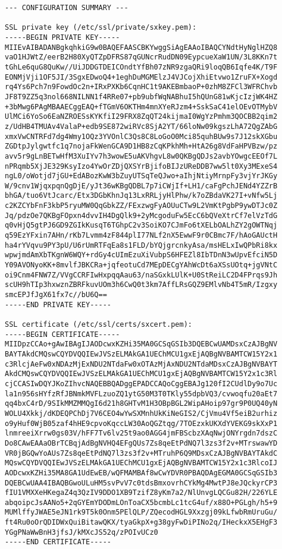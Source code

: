 \begin{lstlisting}
--- CONFIGURATION SUMMARY ---

SSL private key (/etc/ssl/private/sxkey.pem):
-----BEGIN PRIVATE KEY-----
MIIEvAIBADANBgkqhkiG9w0BAQEFAASCBKYwggSiAgEAAoIBAQCYNdtHyNglHZQ8
vaO1HJWtZ/eerB2H80XyQTZpDFRS87qGUNcrRudDN09EypcueXaW1UN/3L8KKn7t
tGhLe6quG8QuKw//UiJDDGTDEICOndtYfBh07zNR9zgaQRi9loqQB6Iqfe4K/T9F
EONMjVji1OF5JI/3SgxEDwoQ4+1eghDuMGMElzJ4VJCojXhiEtvwo1ZruFX+Xogd
rq4Ys6Pch7n9FowdOc2n+IRxPXKb6CqnHC1t9AKEBmbaoP+0zhM8ZFCl3WFRChvb
JF8T9ZZ5q3nol668NILNN1f4RRe07+pb9ubfWqNABhuI5hQUnG81wKjcIzjWK4HZ
+3bMwg6PAgMBAAECggEAQ+fTGmV6OKTHm4mnXYeRJzm4+SskSaC41elOEvOTMybV
UlMCi6YoSo6EaNZROESsKYKfiI29FRX8ZqQT24kijmaI0WgYzPmhm3QOCBB2qim2
z/UdHB4TMUAv4ValaP+edb9SE872wiRVc8SjA2YT/66loNw09kgszLhA72QgZAbG
xmxVwCNTRFd7dg4Wmy1OQz3YVOnlC3Qs8C8LoGoO0Mci85quhBUw9s7J12skXGbu
ZGDtpJylgwtfc1q7nojaFkWenGCA9D1HB8zCqKPkhMh+HtA26g8VdFaHPVBzw/pz
avv5r9gLnBETwHfM3XuIYv7h3wowE5uAKVhgvL8w0QKBgQDJs2avbYOwgcEEOf7L
nPRqmb5XjJE329KsyIzo4YwOrZDjQXSYrBjifoBIJzUReDDB7ww5lt0Xy3MExeS4
ngL0/oWotjd7jGU+EdABozKwW3bZuyUTSqTeQJwo+aIhjNtiyMrnpFy3vjYrJKGy
W/9cnv1WjqxpqnQgDjE/yJt36wKBgQDBL7p7iCWjIf+LH1/caFgPchJENd4YZZrB
bhGA/tuo6VtJcarc/Etx3DGbKhnJq13LxRRLjyHlPhw/k7oZBdaVK27I+vNfw5Lj
c2KZCYbFnF3kbP5ryuMW0QqGbkZZ/FExzwgFyAOUuCTw9L2VmKtPgbP9ywDTJc0Z
Jq/pdzOe7QKBgFOpxn4dvvIH4DgQlk9+2yMcgoduFw5EcC6bQVeXtrCf7elVzTdG
q0vHjQ5gtPJ6GD9ZGIkKusqT6TGhpC2v3SoiKO7CJmFo6tXELbOALhZY2gOWTNqj
q59EzYFxin7AHn/rKb7Lvmm4zF844plI77NLf2nX5EwwF9r0CBmc7F/hAoGAUctH
ha4rYVqvu9PY3pU/U6rUmRTFqEa8s1FLD/bYQjgrcnkyAsa/msHELxIwQPbRi8kx
wpwjmdAmXbTKgnW6WQY+rdGy4cUImEzuXiVubpS6HFEZl8IbTDnN3wUpvEfciN5D
Y09AVONyoKK+8mvlfJBKCRa+jqfeotuCd7MEpDECgYAhWcDt6aXSsUOtq+jgVNtC
oi9Cnm4FNW7Z/VVgCCRFIwHxpqqAau63/naSGxkLUlK+U0StReiLC2D4FPrqs9Jh
scUH9hTIp3hxwznZBRFkuvUOm3h6CwQ0t3km7AffLRsGQZ9EMlvNb4T5mR/Izgxy
smcEPJfJgX61fx7c//bU6Q==
-----END PRIVATE KEY-----

SSL certificate (/etc/ssl/certs/sxcert.pem):
-----BEGIN CERTIFICATE-----
MIIDpzCCAo+gAwIBAgIJAODcwxKZHi35MA0GCSqGSIb3DQEBCwUAMDsxCzAJBgNV
BAYTAkdCMQswCQYDVQQIEwJVSzELMAkGA1UEChMCU1gxEjAQBgNVBAMTCW15Y2x1
c3RlcjAeFw0xNDAzMjExNDU2NTdaFw0xOTAzMjAxNDU2NTdaMDsxCzAJBgNVBAYT
AkdCMQswCQYDVQQIEwJVSzELMAkGA1UEChMCU1gxEjAQBgNVBAMTCW15Y2x1c3Rl
cjCCASIwDQYJKoZIhvcNAQEBBQADggEPADCCAQoCggEBAJg120fI2CUdlDy9o7Uc
la1n956sHYfzRfJBNmkMVFLzuoZQ1ytG50M3T0TKly55dpbVQ3/cvwoqfu20aEt7
qq4bxC4rD/9SIkMMZMMQgI6d21h8GHTvM1H3OBpBGL2WipAHoip97gr9P0UQ40yN
WOLU4Xkkj/dKDEQPChDj7V6CEO4wYwSXMnhUkKiNeGIS2/CjVmu4Vf5eiB2urhiz
o9yHuf0WjB05zaf4hHE9cpvoKqccLW30AoQGZtqg/7TOEzxkUKXdYVEKG9skXxP1
lnmreeiXrrw0gs03V/hFF7Tv6lv25t9ao0AGG4jmFBScbzXAqNwjONYrgdn7dszC
Do8CAwEAAaOBrTCBqjAdBgNVHQ4EFgQUs7Zs8qeEtPdNQ7l3zs3f2v+MTrswawYD
VR0jBGQwYoAUs7Zs8qeEtPdNQ7l3zs3f2v+MTruhP6Q9MDsxCzAJBgNVBAYTAkdC
MQswCQYDVQQIEwJVSzELMAkGA1UEChMCU1gxEjAQBgNVBAMTCW15Y2x1c3RlcoIJ
AODcwxKZHi35MA8GA1UdEwEB/wQFMAMBAf8wCwYDVR0PBAQDAgEGMA0GCSqGSIb3
DQEBCwUAA4IBAQBGwoULuHM5svPvV7c0tdsBmxovrhCYkMg4MwtPJ8eJQckyrCP3
fIU1VMXXeHKegaZ4q3QzIV9DDO1XB9TzifZ8yKm7a2/NlUnvgLQCGu82H/226YLE
abqoipcJsAANo5+2qGYEmYDODmLOnToaCX5bcmbLc1tcG4uf/x88O+PGLgh/h5+9
MUMlffyJWAE5eJN1rk9T5k0Onm5PElQLP/ZQecodHGL9Xxzgj09kLfwbRmUruGu/
ft4Ru0oOrQDIDWxQuiBitawQKX/tyaGkpX+g38gyFwDiPINo2q/IHeckxX5EHgF3
YGgPNaWwBnH3jfsJ/kMXcJS52q/zPOIvUCz0
-----END CERTIFICATE-----


\end{lstlisting}
